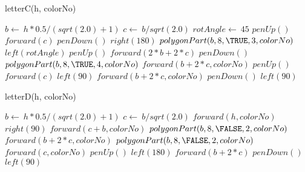 \documentclass[a4paper,10pt]{article}
\begin{document}
\begin{algorithm}
\caption{letterC(h, colorNo)}
\begin{algorithmic}[5]

\STATE {}
\STATE {}
  \STATE \(b\gets\ h*0.5/(sqrt(2.0)+1)\)
  \STATE \(c\gets\ b/sqrt(2.0)\)
  \STATE \(rotAngle\gets\ 45\)
  \STATE \(penUp()\)
  \STATE \(forward(c)\)
  \STATE \(penDown()\)
  \STATE \(right(180)\)
  \STATE {}
  \STATE {}
  \STATE \(polygonPart(b,8,\TRUE,3,colorNo)\)
  \STATE \(left(rotAngle)\)
  \STATE \(penUp()\)
  \STATE \(forward(2*b+2*c)\)
  \STATE \(penDown()\)
  \STATE {}
  \STATE {}
  \STATE \(polygonPart(b,8,\TRUE,4,colorNo)\)
  \STATE \(forward(b+2*c,colorNo)\)
  \STATE \(penUp()\)
  \STATE \(forward(c)\)
  \STATE \(left(90)\)
  \STATE \(forward(b+2*c,colorNo)\)
  \STATE \(penDown()\)
  \STATE \(left(90)\)

\end{algorithmic}
\end{algorithm}


\begin{algorithm}
\caption{letterD(h, colorNo)}
\begin{algorithmic}[5]

\STATE {}
\STATE {}
  \STATE \(b\gets\ h*0.5/(sqrt(2.0)+1)\)
  \STATE \(c\gets\ b/sqrt(2.0)\)
  \STATE \(forward(h,colorNo)\)
  \STATE \(right(90)\)
  \STATE \(forward(c+b,colorNo)\)
  \STATE {}
  \STATE {}
  \STATE \(polygonPart(b,8,\FALSE,2,colorNo)\)
  \STATE \(forward(b+2*c,colorNo)\)
  \STATE {}
  \STATE {}
  \STATE \(polygonPart(b,8,\FALSE,2,colorNo)\)
  \STATE \(forward(c,colorNo)\)
  \STATE \(penUp()\)
  \STATE \(left(180)\)
  \STATE \(forward(b+2*c)\)
  \STATE \(penDown()\)
  \STATE \(left(90)\)

\end{algorithmic}
\end{algorithm}
\end{document}
